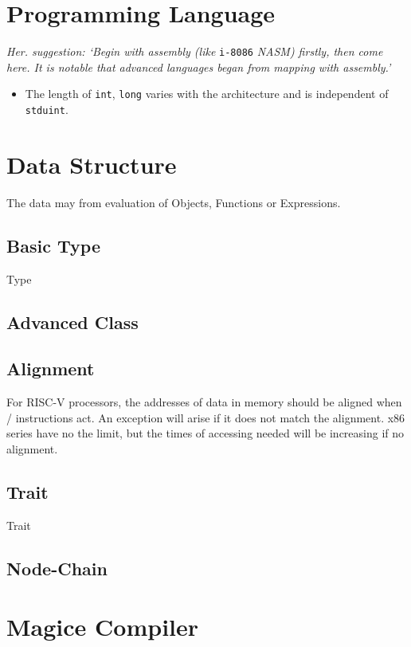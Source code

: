 
\section{Programming Language}

\textit{Her. suggestion: `Begin with assembly (like} \verb|i-8086| \textit{NASM) firstly, then come here. It is notable that advanced languages began from mapping with assembly.'}

\begin{itemize}
	\item The length of \verb`int`, \verb`long` varies with the architecture
		and is independent of \verb`stduint`.
\end{itemize}



\section{Data Structure}

The data may from evaluation of Objects, Functions or Expressions.

\subsection{Basic Type}
{Type}

\subsection{Advanced Class}

\subsection{Alignment}

For RISC-V processors, the addresses of data in memory should be aligned when / instructions act. An exception will arise if it does not match the alignment.
x86 series have no the limit, but the times of accessing needed will be increasing if no alignment.

\subsection{Trait}
{Trait}

\subsection{Node-Chain}


\section{Magice Compiler}


